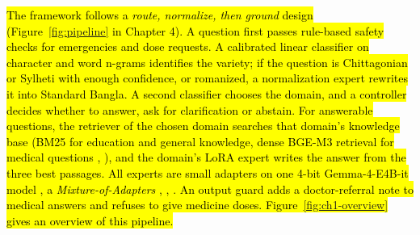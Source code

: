 \hl{The framework follows a \emph{route, normalize, then ground} design
(Figure~\ref{fig:pipeline} in Chapter 4). A question first passes rule-based safety
checks for emergencies and dose requests. A calibrated linear classifier
on character and word n-grams identifies the variety; if the question is
Chittagonian or Sylheti with enough confidence, or romanized, a
normalization expert rewrites it into Standard Bangla. A second
classifier chooses the domain, and a controller decides whether to
answer, ask for clarification or abstain. For answerable questions, the
retriever of the chosen domain searches that domain's knowledge base
(BM25 for education and general knowledge, dense BGE-M3 retrieval for
medical questions \cite{robertson2009bm25}, \cite{chen2024bgem3}), and the domain's LoRA expert
writes the answer from the three best passages. All experts are small
adapters on one 4-bit Gemma-4-E4B-it model \cite{gemma4}, a
\emph{Mixture-of-Adapters} \cite{hu2022lora}, \cite{houlsby2019adapters}, \cite{shazeer2017moe}. An output guard
adds a doctor-referral note to medical answers and refuses to give
medicine doses. Figure~\ref{fig:ch1-overview} gives an overview of
this pipeline.}

